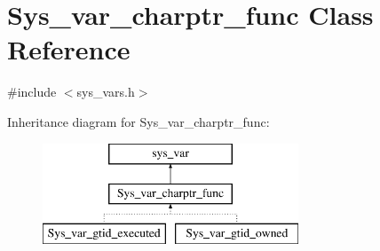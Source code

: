 \hypertarget{classSys__var__charptr__func}{}\section{Sys\+\_\+var\+\_\+charptr\+\_\+func Class Reference}
\label{classSys__var__charptr__func}


{\ttfamily \#include $<$sys\+\_\+vars.\+h$>$}

Inheritance diagram for Sys\+\_\+var\+\_\+charptr\+\_\+func\+:\begin{figure}[H]
\begin{center}
\leavevmode
\includegraphics[height=3.000000cm]{classSys__var__charptr__func}
\end{center}
\end{figure}

